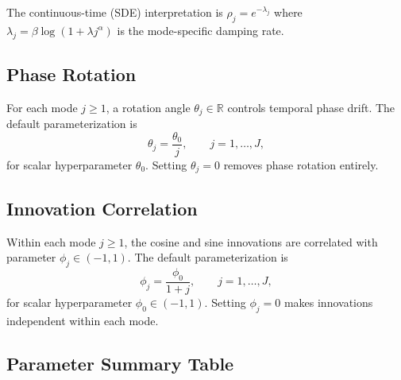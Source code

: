 \documentclass[12pt]{article}
\begin{document}
The continuous-time (SDE) interpretation is $\rho_j = e^{-\lambda_j}$ where
$\lambda_j = \beta\log(1 + \lambda j^\alpha)$ is the mode-specific damping rate.

\subsection{Phase Rotation}

For each mode $j \geq 1$, a rotation angle $\theta_j \in \mathbb{R}$ controls temporal phase drift.
The default parameterization is
\begin{equation}
  \theta_j = \frac{\theta_0}{j}, \qquad j = 1,\ldots,J,
  \label{eq:thetaj}
\end{equation}
for scalar hyperparameter $\theta_0$. Setting $\theta_j = 0$ removes phase rotation entirely.

\subsection{Innovation Correlation}

Within each mode $j \geq 1$, the cosine and sine innovations are correlated with parameter
$\phi_j \in (-1,1)$. The default parameterization is
\begin{equation}
  \phi_j = \frac{\phi_0}{1 + j}, \qquad j = 1,\ldots,J,
  \label{eq:phij}
\end{equation}
for scalar hyperparameter $\phi_0 \in (-1,1)$. Setting $\phi_j = 0$ makes innovations
independent within each mode.

\subsection{Parameter Summary Table}
\end{document}
